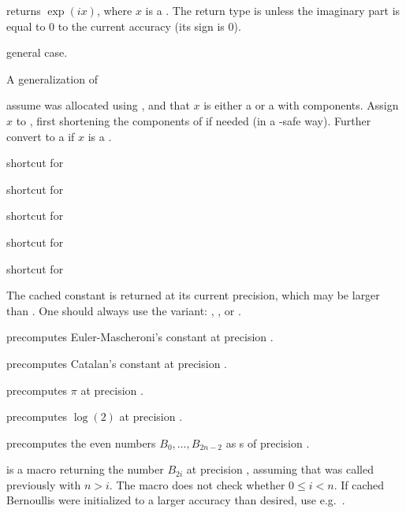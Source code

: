  returns $\exp(ix)$, where $x$ is a .
The return type is  unless the imaginary part is equal to $0$
to the current accuracy (its sign is $0$).

 general case.

\noindent A generalization of 

 assume  was allocated using
, and that $x$ is either a  or a 
with  components. Assign $x$ to , first shortening
the components of  if needed (in a -safe way). Further
convert  to a  if $x$ is a .


 shortcut for 

 shortcut for 

 shortcut for 

 shortcut for 

 shortcut for 


The cached constant is returned at its current precision, which may be larger
than . One should always use the  variant:
, , or .

 precomputes Euler-Mascheroni's constant
at precision .

 precomputes Catalan's constant at precision
.

 precomputes $\pi$ at precision .

 precomputes $\log(2)$ at precision
.

 precomputes the even 
numbers $B_0,\dots,B_{2n-2}$ as s of precision .

 is a macro returning the  number
$B_{2i}$ at precision , assuming that  was
called previously with $n > i$. The macro does not check whether
$0 \leq i < n$. If cached Bernoullis were initialized to a larger accuracy
than desired, use e.g.~.

